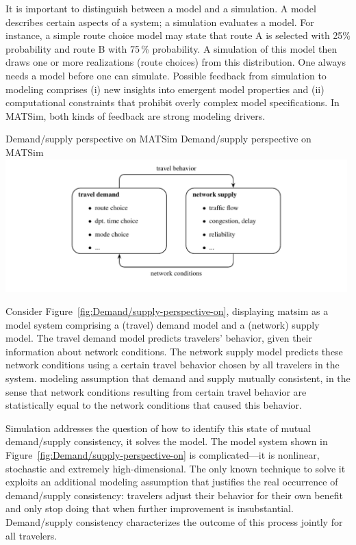 It is important to distinguish between a \gls{model} and a \gls{simulation}. A
model describes certain aspects of a system; a simulation evaluates
a model. For instance, a simple route choice model may state that
route A is selected with 25\% probability and route B with 75\,\% probability.
A simulation of this model then draws one or more realizations (route
choices) from this distribution. One always needs a model before one
can simulate. Possible feedback from simulation to modeling comprises
(i) new insights into emergent model properties and (ii) computational
constraints that prohibit overly complex model specifications. In
MATSim, both kinds of feedback are strong modeling drivers. 


\createfigure%
{Demand/supply perspective on MATSim}%
{Demand/supply perspective on MATSim}%
{\label{fig:Demand/supply-perspective-on}}%
{\includegraphics[width=0.99\textwidth, angle=0]{understanding/figures/mc/fig0.pdf}}%
{}

Consider Figure~\ref{fig:Demand/supply-perspective-on}, displaying
\gls{matsim} as a model system comprising a (travel) demand model and a
(network) supply model. The travel demand model predicts travelers' behavior,
given their information about network conditions.
The network supply model predicts these network conditions using a
certain travel behavior chosen by all travelers in the system. 
 modeling assumption that demand
and supply  mutually consistent, in the sense that network
conditions resulting from certain travel behavior are statistically equal to the network
conditions that caused this behavior.

Simulation addresses the question of how to identify this state of
mutual demand/supply consistency, \ie it solves the model. The model
system shown in Figure~\ref{fig:Demand/supply-perspective-on} is
complicated---it is nonlinear, stochastic and extremely high-dimensional.
The only known technique to solve it exploits an additional modeling
assumption that justifies the real occurrence of demand/supply consistency:
travelers adjust their behavior for their own benefit and only
stop doing that when further improvement is insubstantial. Demand/supply
consistency characterizes the outcome of this process jointly for
all travelers.

